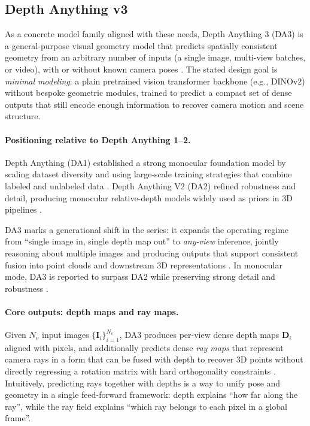 \documentclass{report}
\begin{document}
\subsection{Depth Anything v3}
As a concrete model family aligned with these needs, Depth Anything 3 (DA3) is a general-purpose visual geometry model that predicts spatially consistent geometry from an arbitrary number of inputs (a single image, multi-view batches, or video), with or without known camera poses \cite{lin2025depthanything3}. The stated design goal is \emph{minimal modeling}: a plain pretrained vision transformer backbone (e.g., DINOv2) without bespoke geometric modules, trained to predict a compact set of dense outputs that still encode enough information to recover camera motion and scene structure.

\paragraph{Positioning relative to Depth Anything 1--2.}
Depth Anything (DA1) established a strong monocular foundation model by scaling dataset diversity and using large-scale training strategies that combine labeled and unlabeled data \cite{yang2024depth}. Depth Anything V2 (DA2) refined robustness and detail, producing monocular relative-depth models widely used as priors in 3D pipelines \cite{yang2024depthanythingv2}.

DA3 marks a generational shift in the series: it expands the operating regime from ``single image in, single depth map out'' to \emph{any-view} inference, jointly reasoning about multiple images and producing outputs that support consistent fusion into point clouds and downstream 3D representations \cite{lin2025depthanything3}. In monocular mode, DA3 is reported to surpass DA2 while preserving strong detail and robustness \cite{lin2025depthanything3}.

\paragraph{Core outputs: depth maps and ray maps.}
Given $N_v$ input images $\{\mathbf{I}_i\}_{i=1}^{N_v}$, DA3 produces per-view dense depth maps $\mathbf{D}_i$ aligned with pixels, and additionally predicts dense \emph{ray maps} that represent camera rays in a form that can be fused with depth to recover 3D points without directly regressing a rotation matrix with hard orthogonality constraints \cite{lin2025depthanything3}. Intuitively, predicting rays together with depths is a way to unify pose and geometry in a single feed-forward framework: depth explains ``how far along the ray'', while the ray field explains ``which ray belongs to each pixel in a global frame''.
\end{document}

